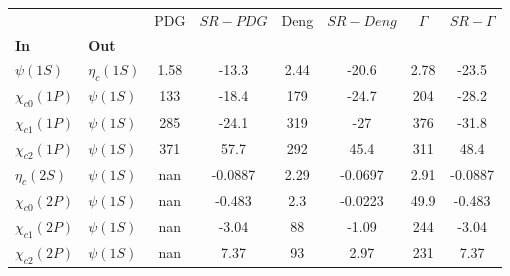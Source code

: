 \begin{tabular}{l|l|c|c|c|c|c|c}
\toprule
                &            &  PDG & $SR-PDG$ &  Deng & $SR-Deng$ &  $\Gamma$ & $SR-\Gamma$ \\
\textbf{In} & \textbf{Out} &      &          &       &           &           &             \\
\midrule
\textbf{$\psi(1S)$} & \textbf{$\eta_{c}(1S)$} & 1.58 &    -13.3 &  2.44 &     -20.6 &      2.78 &       -23.5 \\
\textbf{$\chi_{c0}(1P)$} & \textbf{$\psi(1S)$} &  133 &    -18.4 &   179 &     -24.7 &       204 &       -28.2 \\
\textbf{$\chi_{c1}(1P)$} & \textbf{$\psi(1S)$} &  285 &    -24.1 &   319 &       -27 &       376 &       -31.8 \\
\textbf{$\chi_{c2}(1P)$} & \textbf{$\psi(1S)$} &  371 &     57.7 &   292 &      45.4 &       311 &        48.4 \\
\textbf{$\eta_{c}(2S)$} & \textbf{$\psi(1S)$} &  nan &  -0.0887 &  2.29 &   -0.0697 &      2.91 &     -0.0887 \\
\textbf{$\chi_{c0}(2P)$} & \textbf{$\psi(1S)$} &  nan &   -0.483 &   2.3 &   -0.0223 &      49.9 &      -0.483 \\
\textbf{$\chi_{c1}(2P)$} & \textbf{$\psi(1S)$} &  nan &    -3.04 &    88 &     -1.09 &       244 &       -3.04 \\
\textbf{$\chi_{c2}(2P)$} & \textbf{$\psi(1S)$} &  nan &     7.37 &    93 &      2.97 &       231 &        7.37 \\
\bottomrule
\end{tabular}
